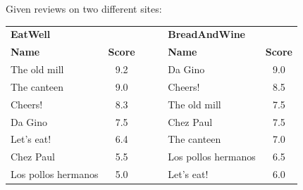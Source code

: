 \begin{example}
    Given reviews on two different sites:
    \begin{table}[H]
        \centering
        \begin{tabular}{ccccc}
        \multicolumn{1}{l}{\textbf{EatWell}}     &                                     & $\:\:\:\:\:\:$                 & \multicolumn{1}{l}{\textbf{BreadAndWine}} &                                  \\ \cline{1-2} \cline{4-5} 
        \multicolumn{1}{|l}{\textbf{Name}}       & \multicolumn{1}{c|}{\textbf{Score}} & \multicolumn{1}{c|}{\textbf{}} & \multicolumn{1}{l}{\textbf{Name}}        & \multicolumn{1}{c|}{\textbf{Score}} \\ \cline{1-2} \cline{4-5} 
        \multicolumn{1}{|l}{The old mill}        & \multicolumn{1}{c|}{9.2}            & \multicolumn{1}{c|}{}          & \multicolumn{1}{l}{Da Gino}              & \multicolumn{1}{c|}{9.0}            \\
        \multicolumn{1}{|l}{The canteen}         & \multicolumn{1}{c|}{9.0}            & \multicolumn{1}{c|}{}          & \multicolumn{1}{l}{Cheers!}              & \multicolumn{1}{c|}{8.5}            \\  
        \multicolumn{1}{|l}{Cheers!}             & \multicolumn{1}{c|}{8.3}            & \multicolumn{1}{c|}{}          & \multicolumn{1}{l}{The old mill}         & \multicolumn{1}{c|}{7.5}            \\ 
        \multicolumn{1}{|l}{Da Gino}             & \multicolumn{1}{c|}{7.5}            & \multicolumn{1}{c|}{}          & \multicolumn{1}{l}{Chez Paul}            & \multicolumn{1}{c|}{7.5}            \\ 
        \multicolumn{1}{|l}{Let's eat!}          & \multicolumn{1}{c|}{6.4}            & \multicolumn{1}{c|}{}          & \multicolumn{1}{l}{The canteen}          & \multicolumn{1}{c|}{7.0}            \\ 
        \multicolumn{1}{|l}{Chez Paul}           & \multicolumn{1}{c|}{5.5}            & \multicolumn{1}{c|}{}          & \multicolumn{1}{l}{Los pollos hermanos}  & \multicolumn{1}{c|}{6.5}            \\ 
        \multicolumn{1}{|l}{Los pollos hermanos} & \multicolumn{1}{c|}{5.0}            & \multicolumn{1}{c|}{}          & \multicolumn{1}{l}{Let's eat!}           & \multicolumn{1}{c|}{6.0}            \\ \cline{1-2} \cline{4-5} 
        \end{tabular}
    \end{table}

\end{example}
